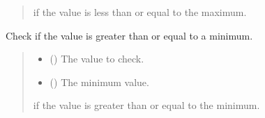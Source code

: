 \documentclass[letterpaper,10pt,english]{sphinxmanual}
\begin{document}
\begin{fulllineitems}
\begin{fulllineitems}
\begin{quote}
\begin{description}
\begin{itemize}
\end{itemize}

\sphinxAtStartPar
{} if the value is less than or equal to the maximum.

\end{description}\end{quote}

\end{fulllineitems}


\begin{fulllineitems}
\label{\detokenize{apache_commons_validator_python.routines:apache_commons_validator_python.routines.abstract_number_validator.AbstractNumberValidator.min_value}}
\pysigstartsignatures
{}
\pysigstopsignatures
\sphinxAtStartPar
Check if the value is greater than or equal to a minimum.
\begin{quote}\begin{description}
\begin{itemize}
\item {} 
\sphinxAtStartPar
{} () \textendash{} The value to check.

\item {} 
\sphinxAtStartPar
{} () \textendash{} The minimum value.

\end{itemize}

\sphinxAtStartPar
{} if the value is greater than or equal to the minimum.

\end{description}\end{quote}

\end{fulllineitems}


\end{fulllineitems}
\end{document}
